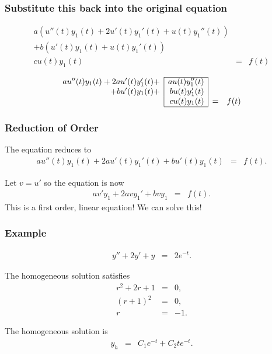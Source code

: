 \documentclass{beamer}
\newcommand{\lp}{\left(}
\newcommand{\rp}{\right)}
\begin{document}
\begin{frame}
  \frametitle{Substitute this back into the original equation}

  \begin{eqnarray*}
    a \lp u''(t) y_1(t) + 2 u'(t) y_1'(t) + u(t) y_1''(t) \rp & & \\
    + b \lp u'(t) y_1(t) + u(t) y_1'(t) \rp & & \\
    c u(t) y_1(t) & = & f(t) 
  \end{eqnarray*}

  \begin{eqnarray*}
    \begin{array}{r|r|cl}
      \cline{2-2}
      a u''(t) y_1(t) + 2 a u'(t) y_1'(t) + & a u(t) y_1''(t)  & & \\ 
      + b  u'(t) y_1(t) + & b u(t) y_1'(t)  & & \\
      & c u(t) y_1(t) & = & f(t)  \\       \cline{2-2}
    \end{array}
  \end{eqnarray*}

\end{frame}


\begin{frame}
  \frametitle{Reduction of Order}

  The equation reduces to
  \begin{eqnarray*}
    a u''(t) y_1(t) + 2 a u'(t) y_1'(t) + b  u'(t) y_1(t) & = & f(t).
  \end{eqnarray*}

  Let $v=u'$ so the equation is now
  \begin{eqnarray*}
    a v' y_1 + 2 a v y_1' + b v y_1 & = & f(t).
  \end{eqnarray*}
  This is a first order, linear equation! We can solve this!


\end{frame}


\begin{frame}
  \frametitle{Example}

  \begin{eqnarray*}
    y'' + 2 y' + y & = & 2 e^{-t}.
  \end{eqnarray*}

  The homogeneous solution satisfies
  \begin{eqnarray*}
    r^2 + 2r + 1 & = & 0, \\
    (r+1)^2 & = & 0, \\
    r & = & -1.
  \end{eqnarray*}

  The homogeneous solution is
  \begin{eqnarray*}
    y_h & = & C_1 e^{-t} + C_2 t e^{-t}.
  \end{eqnarray*}

\end{frame}
\end{document}
